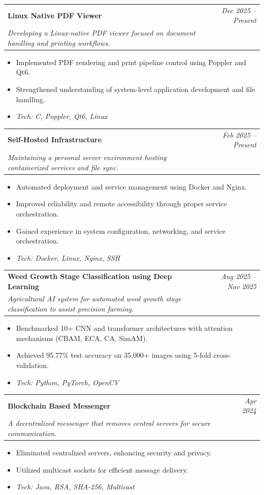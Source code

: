 \documentclass[a4paper,10.5pt]{article}
\makeatletter
\newcommand{\resumeProject}[4]{
  \vspace{1mm}\item
    \begin{tabular*}{0.98\textwidth}[t]{l@{\extracolsep{\fill}}r}
        \textbf{#1} & \textit{\footnotesize #3} \\
        \footnotesize\textit{#2} & \footnotesize #4 \\
    \end{tabular*}
    \vspace{-1.8mm}
}
\newcommand{\resumeItemListStart}{%
  \begin{itemize}[leftmargin=2.2ex, rightmargin=1ex, label={},
                  itemsep=0.8mm, parsep=0pt, topsep=1mm]\small
}
\newcommand{\resumeItemListEnd}{\end{itemize}\vspace{1mm}}
\makeatother
\begin{document}
    \resumeProject
      {Linux Native PDF Viewer}
      {Developing a Linux-native PDF viewer focused on document handling and printing workflows.}
      {Dec 2025 -- Present}
      {}
    \resumeItemListStart
      \item Implemented PDF rendering and print pipeline control using Poppler and Qt6.
      \item Strengthened understanding of system-level application development and file handling.
      \item \textit{Tech: C, Poppler, Qt6, Linux}
    \resumeItemListEnd

    \resumeProject
      {Self-Hosted Infrastructure}
      {Maintaining a personal server environment hosting containerized services and file sync.}
      {Feb 2025 -- Present}
      {}
    \resumeItemListStart
      \item Automated deployment and service management using Docker and Nginx.
      \item Improved reliability and remote accessibility through proper service orchestration.
      \item Gained experience in system configuration, networking, and service orchestration.
      \item \textit{Tech: Docker, Linux, Nginx, SSH}
    \resumeItemListEnd

    \resumeProject
      {Weed Growth Stage Classification using Deep Learning}
      {Agricultural AI system for automated weed growth stage classification to assist precision farming.}
      {Aug 2025 -- Nov 2025}
      {}
    \resumeItemListStart
      \item Benchmarked 10+ CNN and transformer architectures with attention mechanisms (CBAM, ECA, CA, SimAM).
      \item Achieved 95.77\% test accuracy on 35,000+ images using 5-fold cross-validation.
      \item \textit{Tech: Python, PyTorch, OpenCV}
    \resumeItemListEnd

    \resumeProject
      {Blockchain Based Messenger}
      {A decentralized messenger that removes central servers for secure communication.}
      {Apr 2024}
      {}
    \resumeItemListStart
      \item Eliminated centralized servers, enhancing security and privacy.
      \item Utilized multicast sockets for efficient message delivery.
      \item \textit{Tech: Java, RSA, SHA-256, Multicast}
    \resumeItemListEnd
\end{document}

